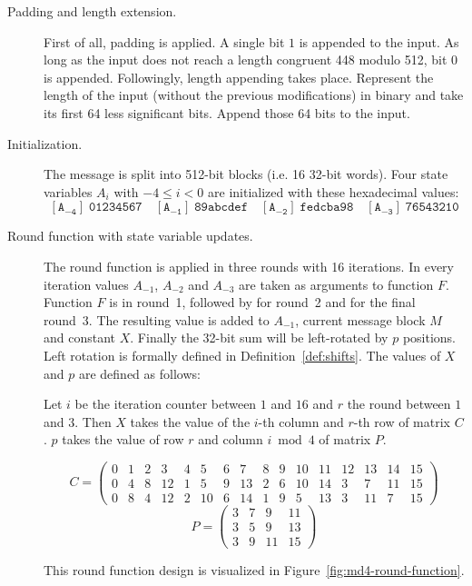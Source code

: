 \begin{description}
  \item[Padding and length extension.]
    First of all, padding is applied. A single bit $1$ is appended to the
    input. As long as the input does not reach a length congruent 448 modulo 512,
    bit $0$ is appended.
    Followingly, length appending takes place. Represent the length of the input
    (without the previous modifications) in binary and take its first
    64 less significant bits. Append those 64 bits to the input.
  \item[Initialization.]
    The message is split into 512-bit blocks (i.e. 16 32-bit words).
    Four state variables $A_{i}$ with $-4 \leq i < 0$ are initialized with these
    hexadecimal values:
    \[
      \mathtt{[A_{-4}]}\; \texttt{01234567} \quad
      \mathtt{[A_{-1}]}\; \texttt{89abcdef} \quad
      \mathtt{[A_{-2}]}\; \texttt{fedcba98} \quad
      \mathtt{[A_{-3}]}\; \texttt{76543210}
    \]
  \item[Round function with state variable updates.]
    The round function is applied in three rounds with 16 iterations.
    In every iteration values $A_{-1}$, $A_{-2}$ and $A_{-3}$ are taken
    as arguments to function $F$. Function $F$ is  in round~1,
    followed by  for round~2 and  for the final round~3.
    The resulting value is added to $A_{-1}$, current message block $M$
    and constant $X$. Finally the 32-bit sum will be left-rotated by $p$
    positions. Left rotation is formally defined in Definition~\ref{def:shifts}.
    The values of $X$ and $p$ are defined as follows:

    Let $i$ be the iteration counter between $1$ and $16$ and
    $r$ the round between $1$ and $3$. Then $X$ takes the value
    of the $i$-th column and $r$-th row of matrix $C$.
    $p$ takes the value of row $r$ and column $i \bmod{4}$ of matrix $P$.
    
    \[
      C = \left(\begin{array}{cccccccccccccccc}
        0 & 1 & 2 & 3 & 4 & 5 & 6 & 7 & 8 & 9 & 10 & 11 & 12 & 13 & 14 & 15 \\
        0 & 4 & 8 & 12 & 1 & 5 & 9 & 13 & 2 & 6 & 10 & 14 & 3 & 7 & 11 & 15 \\
        0 & 8 & 4 & 12 & 2 & 10 & 6 & 14 & 1 & 9 & 5 & 13 & 3 & 11 & 7 & 15
      \end{array}\right)
    \] \[
      P = \begin{pmatrix}
        3 & 7 & 9 & 11 \\
        3 & 5 & 9 & 13 \\
        3 & 9 & 11 & 15
      \end{pmatrix}
    \]

    This round function design is visualized in Figure~\ref{fig:md4-round-function}.
\end{description}

